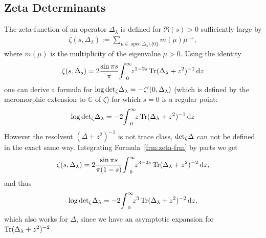 \subsection{Zeta Determinants}
The zeta-function of an operator $\Delta_\lambda$ is defined for $\Re(s) > 0$
sufficiently large by
\begin{align}
  \zeta(s,\Delta_\lambda) :=
  \sum_{\mu\in\operatorname{spec}\Delta_\lambda\setminus\{0\}} m(\mu)\mu^{-s},
\end{align}
where $m(\mu)$ is the multiplicity of the eigenvalue $\mu > 0$. Using the
identity
\begin{align}
  \label{frm:zeta-frm}
  \zeta(s,\Delta_s) = 2 \frac{\sin\pi
  s}{\pi}\Regint[0]{z}{z^{1-2s}\Tr(\Delta_\lambda + z^2)^{-1}}
\end{align}
one can derive a formula for $\log\zdet\Delta_\lambda =
-\zeta'(0,\Delta_\lambda)$ (which is defined by the meromorphic extension to
$\mathbb{C}$ of $\zeta$) for which $s=0$ is a regular point:
\begin{align}
  \log\zdet\Delta_\lambda = -2\Regint[0]{z}{z\Tr(\Delta_\lambda + z^2)^{-1}}
\end{align}
However the resolvent $(\Delta + z^2)^{-1}$ is not trace class, $\zdet\Delta$
can not be defined in the exact same way. Integrating
Formula~\eqref{frm:zeta-frm} by parts we get
\begin{align}
  \zeta(s,\Delta_\lambda) = 2\frac{\sin\pi
  s}{\pi(1-s)}\Regint[0]{z}{z^{3-2s}\Tr(\Delta_\lambda + z^2)^{-2}},
\end{align}
and thus
\begin{align}
  \log\zdet\Delta_\lambda = -2 \Regint[0]{z}{z^3\Tr(\Delta_\lambda + z^2)^{-2}},
\end{align}
which also works for $\Delta$, since we have an asymptotic expansion for
$\Tr(\Delta_\lambda + z^2)^{-2}$.

